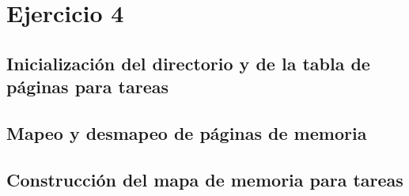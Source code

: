 \section{Ejercicio 4}
\par{}

\subsection*{Inicialización del directorio y de la tabla de páginas para tareas}
\par{}


\subsection*{Mapeo y desmapeo de páginas de memoria}
\par{}

\subsection*{Construcción del mapa de memoria para tareas}
\par{}

\clearpage